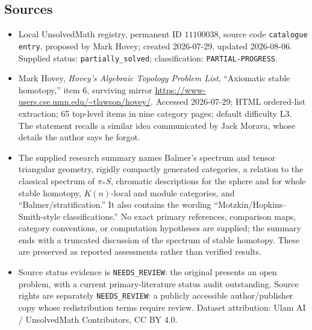 \documentclass[11pt]{article}
\begin{document}
\subsection{Sources}
\begin{itemize}
\item Local UnsolvedMath registry, permanent ID $11100038$, source code \texttt{catalogue entry}, proposed by Mark Hovey; created 2026-07-29, updated 2026-08-06. Supplied status: \texttt{partially\_solved}; classification: \texttt{PARTIAL-PROGRESS}.
\item Mark Hovey, \emph{Hovey's Algebraic Topology Problem List}, ``Axiomatic stable homotopy,'' item 6, surviving mirror \url{https://www-users.cse.umn.edu/~tlawson/hovey/}. Accessed 2026-07-29; HTML ordered-list extraction; 65 top-level items in nine category pages; default difficulty L3. The statement recalls a similar idea communicated by Jack Morava, whose details the author says he forgot.
\item The supplied research summary names Balmer's spectrum and tensor triangular geometry, rigidly compactly generated categories, a relation to the classical spectrum of $\pi_*S$, chromatic descriptions for the sphere and for whole stable homotopy, $K(n)$-local and module categories, and ``Balmer/stratification.'' It also contains the wording ``Motzkin/Hopkins--Smith-style classifications.'' No exact primary references, comparison maps, category conventions, or computation hypotheses are supplied; the summary ends with a truncated discussion of the spectrum of stable homotopy. These are preserved as reported assessments rather than verified results.
\item Source status evidence is \texttt{NEEDS\_REVIEW}: the original presents an open problem, with a current primary-literature status audit outstanding. Source rights are separately \texttt{NEEDS\_REVIEW}: a publicly accessible author/publisher copy whose redistribution terms require review. Dataset attribution: Ulam AI / UnsolvedMath Contributors, CC BY 4.0.
\end{itemize}
\end{document}
